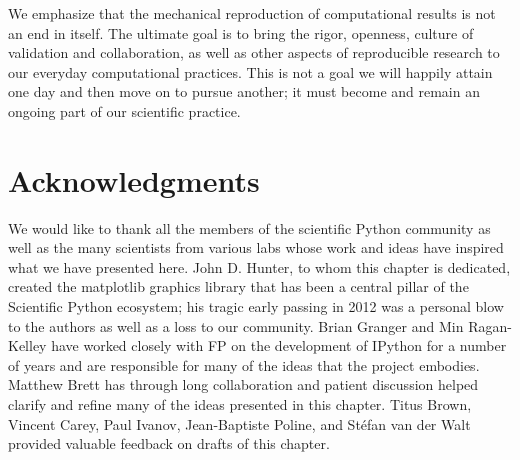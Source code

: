 \documentclass[11pt,oneside,english]{article}
\begin{document}
We emphasize that the mechanical reproduction of computational results
is not an end in itself.  The ultimate goal is to bring the rigor, openness,
culture of validation and collaboration, as well as other aspects of
reproducible research to our everyday computational practices. This is not a
goal we will happily attain one day and then move on to pursue another;
it must become and remain an ongoing part of our scientific practice.

\section*{Acknowledgments}

We would like to thank all the members of the scientific Python community as
well as the many scientists from various labs whose work and ideas have inspired
what we have presented here.  John D. Hunter, to whom this chapter is dedicated,
created the matplotlib graphics library that has been a central pillar of the
Scientific Python ecosystem; his tragic early passing in 2012 was a personal
blow to the authors as well as a loss to our community.  Brian Granger and Min
Ragan-Kelley have worked closely with FP on the development of IPython for a
number of years and are responsible for many of the ideas that the project
embodies.  Matthew Brett has through long collaboration and patient
discussion helped clarify and refine many of the ideas presented in this
chapter.  Titus Brown, Vincent Carey, Paul Ivanov, Jean-Baptiste Poline, and
Stéfan van der Walt provided valuable feedback on drafts of this chapter.



\end{document}
